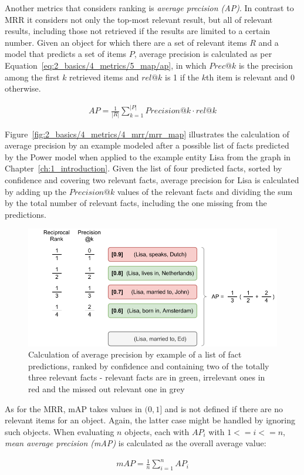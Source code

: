 Another metrics that considers ranking is \emph{average precision (AP)}. In contrast to MRR it considers not only the top-most relevant result, but all of relevant results, including those not retrieved if the results are limited to a certain number. Given an object for which there are a set of relevant items $R$ and a model that predicts a set of items $P$, average precision is calculated as per Equation~\ref{eq:2_basics/4_metrics/5_map/ap}, in which $Prec@k$ is the precision among the first $k$ retrieved items and $rel@k$ is 1 if the $k$th item is relevant and 0 otherwise.

\begin{align}
    AP = \frac{1}{|R|} \sum_{k=1}^{|P|} Precision@k \cdot rel@k
    \label{eq:2_basics/4_metrics/5_map/ap}
\end{align}

Figure~\ref{fig:2_basics/4_metrics/4_mrr/mrr_map} illustrates the calculation of average precision by an example modeled after a possible list of facts predicted by the Power model when applied to the example entity Lisa from the graph in Chapter~\ref{ch:1_introduction}. Given the list of four predicted facts, sorted by confidence and covering two relevant facts, average precision for Lisa is calculated by adding up the $Precision@k$ values of the relevant facts and dividing the sum by the total number of relevant facts, including the one missing from the predictions.

\begin{figure}[t]
    \centering
    \includegraphics{2_basics/4_metrics/5_map/mrr_map}
    \caption{Calculation of average precision by example of a list of fact predictions, ranked by confidence and containing two of the totally three relevant facts - relevant facts are in green, irrelevant ones in red and the missed out relevant one in grey}
    \label{fig:2_basics/4_metrics/5_map/mrr_map}
\end{figure}

As for the MRR, mAP takes values in $(0, 1]$ and is not defined if there are no relevant items for an object. Again, the latter case might be handled by ignoring such objects. When evaluating $n$ objects, each with $AP_i$ with $1 <= i <= n$, \emph{mean average precision (mAP)} is calculated as the overall average value:

\begin{align}
    mAP = \frac{1}{n} \sum_{i=1}^{n} AP_i
    \label{eq:2_basics/4_metrics/5_map/map}
\end{align}


